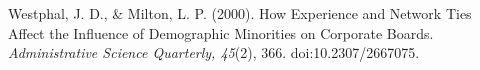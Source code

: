 \begin{thebibliography}{99\kern\bibindent}
\begin{singlespace}
Westphal, J. D., \& Milton, L. P. (2000). How Experience and Network Ties Affect the Influence of Demographic Minorities on Corporate Boards. \emph{Administrative Science Quarterly, 45}(2), 366. doi:10.2307/2667075.
\end{singlespace}

\end{thebibliography}


